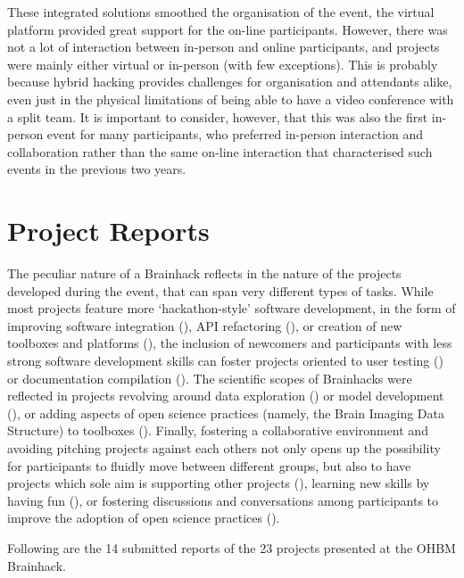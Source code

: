 \documentclass[12pt,a4paper]{proc}
\let\Oldsection\section
\renewcommand{\section}{\FloatBarrier\Oldsection}
\begin{document}
These integrated solutions smoothed the organisation of the event, the
virtual platform provided great support for the on-line participants.
However, there was not a lot of interaction between in-person and online
participants, and projects were mainly either virtual or in-person (with
few exceptions). This is probably because hybrid hacking provides
challenges for organisation and attendants alike, even just in the
physical limitations of being able to have a video conference with a
split team. It is important to consider, however, that this was also the
first in-person event for many participants, who preferred in-person
interaction and collaboration rather than the same on-line interaction
that characterised such events in the previous two years.

\section{Project Reports}

The peculiar nature of a Brainhack\cite{Gau2021} reflects in the nature of the projects developed during the event, that can span very different types of tasks.
While most projects feature more `hackathon-style' software development, in the form of improving software integration (), API refactoring (), or creation of new toolboxes and platforms (), the inclusion of newcomers and participants with less strong software development skills can foster projects oriented to user testing () or documentation compilation ().
The scientific scopes of Brainhacks were reflected in projects revolving around data exploration () or model development (), or adding aspects of open science practices (namely, the Brain Imaging Data Structure) to toolboxes  ().
Finally, fostering a collaborative environment and avoiding pitching projects against each others not only opens up the possibility for participants to fluidly move between different groups, but also to have projects which sole aim is supporting other projects (), learning new skills by having fun (), or fostering discussions and conversations among participants to improve the adoption of open science practices ().  


Following are the 14 submitted reports of the 23 projects presented at the OHBM Brainhack.
\end{document}
